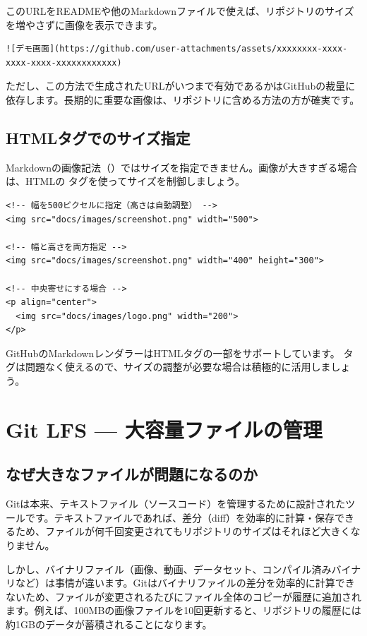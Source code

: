 このURLをREADMEや他のMarkdownファイルで使えば、リポジトリのサイズを増やさずに画像を表示できます。

\begin{lstlisting}[language={}]
![デモ画面](https://github.com/user-attachments/assets/xxxxxxxx-xxxx-xxxx-xxxx-xxxxxxxxxxxx)
\end{lstlisting}

ただし、この方法で生成されたURLがいつまで有効であるかはGitHubの裁量に依存します。長期的に重要な画像は、リポジトリに含める方法の方が確実です。

\subsection{HTMLタグでのサイズ指定}

Markdownの画像記法（）ではサイズを指定できません。画像が大きすぎる場合は、HTMLの  タグを使ってサイズを制御しましょう。

\begin{lstlisting}[language={}]
<!-- 幅を500ピクセルに指定（高さは自動調整） -->
<img src="docs/images/screenshot.png" width="500">

<!-- 幅と高さを両方指定 -->
<img src="docs/images/screenshot.png" width="400" height="300">

<!-- 中央寄せにする場合 -->
<p align="center">
  <img src="docs/images/logo.png" width="200">
</p>
\end{lstlisting}

GitHubのMarkdownレンダラーはHTMLタグの一部をサポートしています。 タグは問題なく使えるので、サイズの調整が必要な場合は積極的に活用しましょう。

\section{Git LFS --- 大容量ファイルの管理}

\subsection{なぜ大きなファイルが問題になるのか}

Gitは本来、テキストファイル（ソースコード）を管理するために設計されたツールです。テキストファイルであれば、差分（diff）を効率的に計算・保存できるため、ファイルが何千回変更されてもリポジトリのサイズはそれほど大きくなりません。

しかし、バイナリファイル（画像、動画、データセット、コンパイル済みバイナリなど）は事情が違います。Gitはバイナリファイルの差分を効率的に計算できないため、ファイルが変更されるたびにファイル全体のコピーが履歴に追加されます。例えば、100MBの画像ファイルを10回更新すると、リポジトリの履歴には約1GBのデータが蓄積されることになります。


